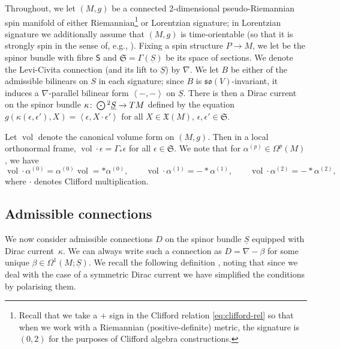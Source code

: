 \documentclass[10pt,a4paper]{amsart}
\numberwithin{equation}{section}
\newcommand{\fso}{\mathfrak{so}}
\newcommand{\fX}{\mathfrak{X}}
\newcommand{\fS}{\mathfrak{S}}
\newcommand{\ssS}{\mathsf{S}}
\newcommand{\Sbundle}{\underline{S}}
\newcommand{\Odot}{\mathchoice{{\textstyle\bigodot}}{\bigodot}{\bigodot}{\bigodot}}
\newcommand{\1}{\mathbbm{1}}
\newcommand{\pair}[2]{\left\langle #1,#2\right\rangle} %
\DeclareMathOperator{\Spin}{Spin}
\DeclareMathOperator{\vol}{vol}
\begin{document}
Throughout, we let $(M,g)$ be a connected 2-dimensional pseudo-Riemannian spin manifold of either Riemannian\footnote{Recall that we take a $+$ sign in the Clifford relation \eqref{eq:clifford-rel} so that when we work with a Riemannian (positive-definite) metric, the signature is $(0,2)$ for the purposes of Clifford algebra constructions.} or Lorentzian signature; in Lorentzian signature we additionally assume that $(M,g)$ is time-orientable (so that it is strongly spin in the sense of, e.g., \cite{Cortes2021}). Fixing a spin structure $P\to M$, we let \smash{$\Sbundle:=P\times_{\Spin(V)} \ssS$} be the spinor bundle with fibre $\ssS$ and $\fS=\Gamma(\Sbundle)$ be its space of sections. We denote the Levi-Civita connection (and its lift to $\Sbundle$) by $\nabla$. We let $B$ be either of the admissible bilinears on $S$ in each signature; since $B$ is $\fso(V)$-invariant, it induces a $\nabla$-parallel bilinear form $\pair{-}{-}$ on $\Sbundle$. There is then a Dirac current on the spinor bundle $\kappa\colon\Odot^2 \Sbundle\to TM$ defined by the equation
$
	g(\kappa(\epsilon,\epsilon'),X) = \pair{\epsilon}{X\cdot \epsilon'}
$
for all $X\in\fX(M)$, $\epsilon,\epsilon'\in\fS$.

Let $\vol$ denote the canonical volume form on $(M,g)$. Then in a local orthonormal frame, $\vol\cdot\epsilon=\Gamma_*\epsilon$ for all $\epsilon\in\fS$. We note that for $\alpha^{(p)}\in\Omega^p(M)$, we have
\[
	\vol\cdot \alpha^{(0)} = \alpha^{(0)}\vol = *\alpha^{(0)},
	\qquad \vol\cdot\alpha^{(1)} = -*\alpha^{(1)},
	\qquad \vol\cdot\alpha^{(2)} = -*\alpha^{(2)},
\]
where $\cdot$ denotes Clifford multiplication.

\subsection{Admissible connections}

We now consider admissible connections $D$ on the spinor bundle $\Sbundle$ equipped with Dirac current~$\kappa$. We can always write such a connection as $D=\nabla-\beta$ for some unique $\beta\in\Omega^1(M;\Sbundle)$. We recall the following definition \cite[Definition~3.6]{Beckett2024_2}, noting that since we deal with the case of a symmetric Dirac current we have simplified the conditions by polarising them.
\end{document}
